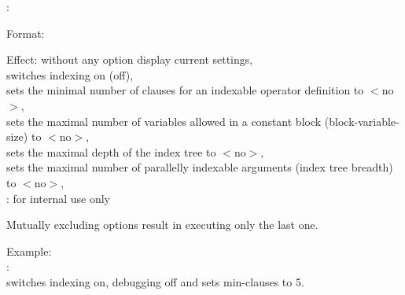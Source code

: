 \indexing:

Format:  

Effect: 
   without any option display current settings,\\
    switches indexing on (off),\\
    sets the minimal number of clauses
	  for an indexable operator definition to $<$no$>$,\\
    sets the maximal number of variables
	  allowed in a constant block (block-variable-size) to $<$no$>$,\\
    sets the maximal depth of the index
	  tree to $<$no$>$,\\
    sets the maximal number of parallelly
	  indexable arguments (index tree breadth) to $<$no$>$,\\
   : for internal use only

Mutually excluding options result in executing only the last one.

Example: \\
 :\\
switches indexing on, debugging off and sets min-clauses to 5.

